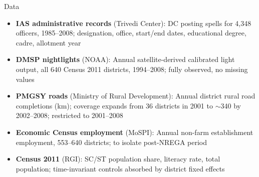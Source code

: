 \documentclass[aspectratio=169]{beamer}
\begin{document}
\begin{frame}{Data}

\begin{itemize}
    \item \textbf{IAS administrative records} (Trivedi Center): DC posting spells for 4,348 officers, 1985--2008; designation, office, start/end dates, educational degree, cadre, allotment year

    \medskip

    \item \textbf{DMSP nightlights} (NOAA): Annual satellite-derived calibrated light output, all 640 Census 2011 districts, 1994--2008; fully observed, no missing values

    \medskip

    \item \textbf{PMGSY roads} (Ministry of Rural Development): Annual district rural road completions (km); coverage expands from 36 districts in 2001 to $\sim$340 by 2002--2008; restricted to 2001--2008

    \medskip

    \item \textbf{Economic Census employment} (MoSPI): Annual non-farm establishment employment, 553--640 districts; to isolate post-NREGA period

    \medskip

    \item \textbf{Census 2011} (RGI): SC/ST population share, literacy rate, total population; time-invariant controls absorbed by district fixed effects
\end{itemize}

\end{frame}
\end{document}
